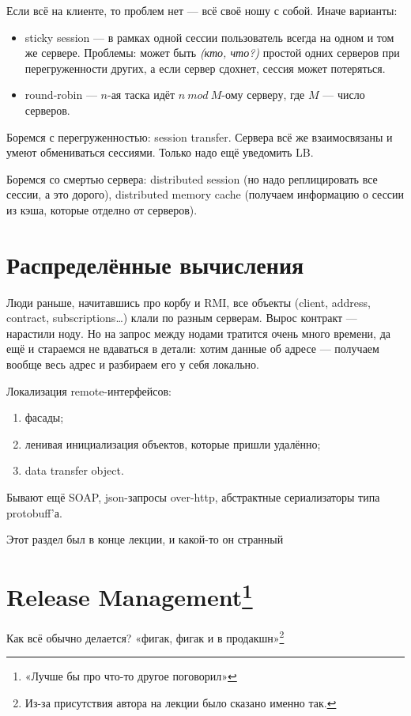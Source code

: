 \documentclass[11pt,a4paper]{article}
\begin{document}
Если всё на клиенте, то проблем нет — всё своё ношу с собой. Иначе варианты:
\begin{itemize}
\item sticky session — в рамках одной сессии пользователь всегда на одном и том же сервере. Проблемы: может быть \textit{(кто, что?)} простой одних серверов при перегруженности других, а если сервер сдохнет, сессия может потеряться.
\item round-robin — $n$-ая таска идёт $n \ mod \ M$-ому серверу, где $M$ — число серверов.
\end{itemize}

Боремся с перегруженностью: session transfer. Сервера всё же взаимосвязаны и умеют обмениваться сессиями. Только надо ещё уведомить LB.

Боремся со смертью сервера: distributed session (но надо реплицировать все сессии, а это дорого), distributed memory cache (получаем информацию о сессии из кэша, которые отделно от серверов).

\section{Распределённые вычисления}
Люди раньше, начитавшись про корбу и RMI, все объекты (client, address, contract, subscriptions…) клали по разным серверам. Вырос контракт — нарастили ноду. Но на запрос между нодами тратится очень много времени, да ещё и стараемся не вдаваться в детали: хотим данные об адресе — получаем вообще весь адрес и разбираем его у себя локально.

Локализация remote-интерфейсов:
\begin{enumerate}
\item фасады;
\item ленивая инициализация объектов, которые пришли удалённо;
\item data transfer object.
\end{enumerate}

Бывают ещё SOAP, json-запросы over-http, абстрактные сериализаторы типа protobuff'а.

Этот раздел был в конце лекции, и какой-то он странный

\section{Release Management\footnote{«Лучше бы про что-то другое поговорил»}}
Как всё обычно делается? «фигак, фигак и в продакшн»\footnote{Из-за присутствия автора на лекции было сказано именно так.}
\end{document}
